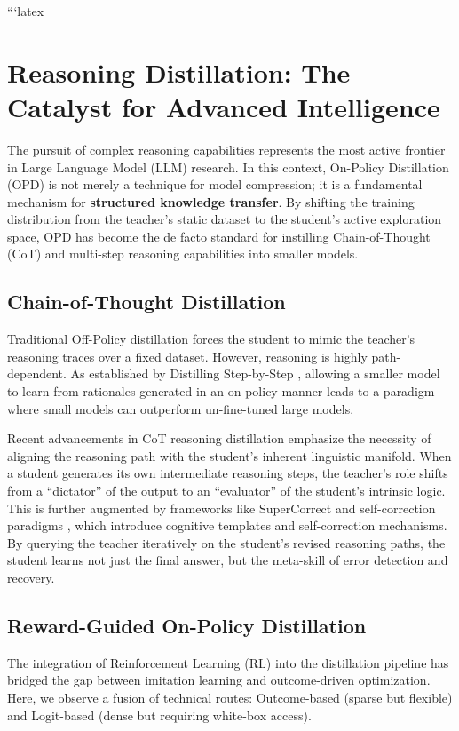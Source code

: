 ```latex
\section{Reasoning Distillation: The Catalyst for Advanced Intelligence}
\label{sec:reasoning}

The pursuit of complex reasoning capabilities represents the most active frontier in Large Language Model (LLM) research. In this context, On-Policy Distillation (OPD) is not merely a technique for model compression; it is a fundamental mechanism for \textbf{structured knowledge transfer}. By shifting the training distribution from the teacher's static dataset to the student's active exploration space, OPD has become the de facto standard for instilling Chain-of-Thought (CoT) and multi-step reasoning capabilities into smaller models.

\subsection{Chain-of-Thought Distillation}
Traditional Off-Policy distillation forces the student to mimic the teacher's reasoning traces over a fixed dataset. However, reasoning is highly path-dependent. As established by Distilling Step-by-Step \citep{arxiv_2305_02301}, allowing a smaller model to learn from rationales generated in an on-policy manner leads to a paradigm where small models can outperform un-fine-tuned large models. 

Recent advancements in CoT reasoning distillation \citep{arxiv_2402_00857, arxiv_2405_04434} emphasize the necessity of aligning the reasoning path with the student's inherent linguistic manifold. When a student generates its own intermediate reasoning steps, the teacher's role shifts from a ``dictator'' of the output to an ``evaluator'' of the student's intrinsic logic. This is further augmented by frameworks like SuperCorrect \citep{arxiv_2410_09008} and self-correction paradigms \citep{arxiv_2409_12917}, which introduce cognitive templates and self-correction mechanisms. By querying the teacher iteratively on the student's revised reasoning paths, the student learns not just the final answer, but the meta-skill of error detection and recovery.

\subsection{Reward-Guided On-Policy Distillation}
The integration of Reinforcement Learning (RL) into the distillation pipeline has bridged the gap between imitation learning and outcome-driven optimization. Here, we observe a fusion of technical routes: Outcome-based (sparse but flexible) and Logit-based (dense but requiring white-box access). 


